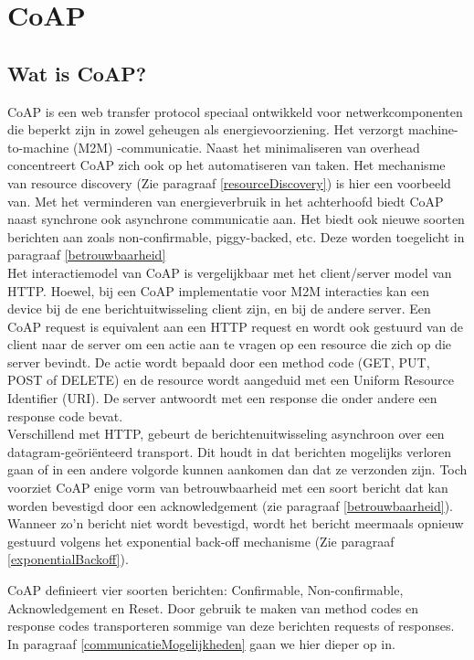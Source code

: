 \chapter{CoAP} \label{CoAP}

\section{Wat is CoAP?}

CoAP is een web transfer protocol speciaal ontwikkeld voor netwerkcomponenten die beperkt zijn in zowel geheugen als energievoorziening. Het verzorgt machine-to-machine (M2M) -communicatie. Naast het minimaliseren van overhead concentreert CoAP zich ook op het automatiseren van taken. Het mechanisme van resource discovery (Zie paragraaf \ref{resourceDiscovery}) is hier een voorbeeld van. Met het verminderen van energieverbruik in het achterhoofd biedt CoAP naast synchrone ook asynchrone communicatie aan. Het biedt ook nieuwe soorten berichten aan zoals non-confirmable, piggy-backed, etc. Deze worden toegelicht in paragraaf \ref{betrouwbaarheid}\\

Het interactiemodel van CoAP is vergelijkbaar met het client/server model van HTTP. Hoewel, bij een CoAP implementatie voor M2M interacties kan een device bij de ene berichtuitwisseling client zijn, en bij de andere server. Een CoAP request is equivalent aan een HTTP request en wordt ook gestuurd van de client naar de server om een actie aan te vragen op een resource die zich op die server bevindt. De actie wordt bepaald door een method code (GET, PUT, POST of DELETE) en de resource wordt aangeduid met een Uniform Resource Identifier (URI). De server antwoordt met een response die onder andere een response code bevat.\\

Verschillend met HTTP, gebeurt de berichtenuitwisseling asynchroon over een datagram-ge\"{o}ri\"{e}nteerd transport. Dit houdt in dat berichten mogelijks verloren gaan of in een andere volgorde kunnen aankomen dan dat ze verzonden zijn. Toch voorziet CoAP enige vorm van betrouwbaarheid met een soort bericht dat kan worden bevestigd door een acknowledgement (zie paragraaf \ref{betrouwbaarheid}). Wanneer zo'n bericht niet wordt bevestigd, wordt het bericht meermaals opnieuw gestuurd volgens het exponential back-off mechanisme (Zie paragraaf \ref{exponentialBackoff}).

CoAP definieert vier soorten berichten: Confirmable, Non-confirmable, Acknowledgement en Reset. Door gebruik te maken van method codes en response codes transporteren sommige van deze berichten requests of responses. In paragraaf \ref{communicatieMogelijkheden} gaan we hier dieper op in.\\

